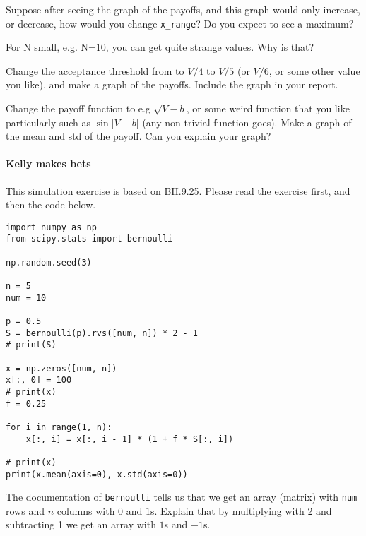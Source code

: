 \documentclass[assignments]{subfiles}
\begin{document}
\begin{exercise}
Suppose after seeing the graph of the payoffs, and this graph would only increase, or decrease, how would you change \verb|x_range|? Do you expect to see a maximum?
\begin{solution}
\end{solution}
\end{exercise}




\begin{exercise}
For N small, e.g. N=10, you can get quite strange values. Why is that?
\begin{solution}
\end{solution}
\end{exercise}


\begin{exercise}
Change the acceptance threshold from to $V/4$ to $V/5$ (or $V/6$, or some other value you like), and make a graph of the payoffs.
Include the graph in your report.
\begin{solution}
\end{solution}
\end{exercise}

\begin{exercise}
Change the payoff function to e.g $\sqrt{V-b}$, or some weird function that you like particularly such as $\sin |V-b|$ (any non-trivial function goes).
Make a graph of the  mean and std of the payoff. Can you explain your graph?
\begin{solution}
\end{solution}
\end{exercise}

\paragraph{Kelly makes bets}

This simulation exercise is based on BH.9.25.  Please read the exercise first, and then the code below.



\begin{verbatim}
import numpy as np
from scipy.stats import bernoulli

np.random.seed(3)

n = 5
num = 10

p = 0.5
S = bernoulli(p).rvs([num, n]) * 2 - 1
# print(S)

x = np.zeros([num, n])
x[:, 0] = 100
# print(x)
f = 0.25

for i in range(1, n):
    x[:, i] = x[:, i - 1] * (1 + f * S[:, i])

# print(x)
print(x.mean(axis=0), x.std(axis=0))
\end{verbatim}

\begin{exercise}
The documentation of \texttt{bernoulli} tells us that we get an array (matrix) with \texttt{num} rows and $n$ columns with $0$ and $1$s. Explain that by multiplying with 2 and subtracting 1 we get an array with $1$s and $-1$s.
\begin{solution}
\end{solution}
\end{exercise}
\end{document}
